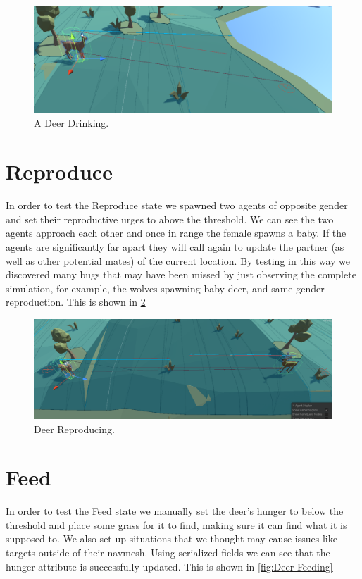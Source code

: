 \documentclass[a4paper, oneside, 11pt]{report}
\begin{document}
	\begin{figure}
		\includegraphics[width=\linewidth]{Deer Drinking.png}
		\caption{A Deer Drinking.}
		\label{fig:Deer Drinking}
	\end{figure}
	
\section{Reproduce}
	In order to test the Reproduce state we spawned two agents of opposite gender and set their reproductive urges to above the threshold. We can see the two agents approach each other and once in range the female spawns a baby. If the agents are significantly far apart they will call again to update the partner (as well as other potential mates) of the current location. By testing in this way we discovered many bugs that may have been missed by just observing the complete simulation, for example, the wolves spawning baby deer, and same gender reproduction. This is shown in \ref{fig:Deer Reproducing}
	
	\begin{figure}
		\includegraphics[width=\linewidth]{Deer Reproducing.png}
		\caption{Deer Reproducing.}
		\label{fig:Deer Reproducing}
	\end{figure}
	
\section{Feed}
	In order to test the Feed state we manually set the deer's hunger to below the threshold and place some grass for it to find, making sure it can find what it is supposed to. We also set up situations that we thought may cause issues like targets outside of their navmesh. Using serialized fields we can see that the hunger attribute is successfully updated. This is shown in \ref{fig:Deer Feeding}
	
\end{document}
